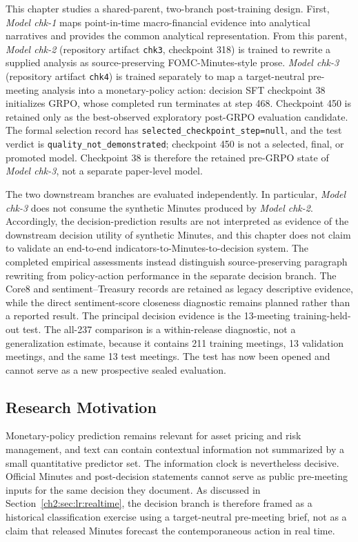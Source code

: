 This chapter studies a shared-parent, two-branch post-training design. First,
\textit{Model chk-1} maps point-in-time macro-financial evidence into analytical
narratives and provides the common analytical representation. From this parent,
\textit{Model chk-2} (repository artifact \texttt{chk3}, checkpoint 318) is
trained to rewrite a supplied analysis as source-preserving
FOMC-Minutes-style prose. \textit{Model chk-3} (repository artifact
\texttt{chk4}) is trained separately to map a target-neutral pre-meeting
analysis into a monetary-policy action: decision SFT checkpoint 38 initializes
GRPO, whose completed run terminates at step 468. Checkpoint 450 is retained
only as the best-observed exploratory post-GRPO evaluation candidate. The
formal selection record has \texttt{selected\_checkpoint\_step=null}, and the
test verdict is \texttt{quality\_not\_demonstrated}; checkpoint 450 is not a
selected, final, or promoted model. Checkpoint 38 is therefore the retained
pre-GRPO state of \textit{Model chk-3}, not a separate paper-level model.

The two downstream branches are evaluated independently. In particular,
\textit{Model chk-3} does not consume the synthetic Minutes produced by
\textit{Model chk-2}. Accordingly, the decision-prediction results are not
interpreted as evidence of the downstream decision utility of synthetic
Minutes, and this chapter does not claim to validate an end-to-end
indicators-to-Minutes-to-decision system. The completed empirical assessments
instead distinguish source-preserving paragraph rewriting from policy-action
performance in the separate decision branch. The Core8 and
sentiment--Treasury records are retained as legacy descriptive evidence, while
the direct sentiment-score closeness diagnostic remains planned rather than a
reported result. The principal decision evidence is the 13-meeting
training-held-out test. The all-237 comparison is a within-release diagnostic,
not a generalization estimate, because it contains 211 training meetings, 13
validation meetings, and the same 13 test meetings. The test has now been
opened and cannot serve as a new prospective sealed evaluation.



\subsection*{Research Motivation}

Monetary-policy prediction remains relevant for asset pricing and risk
management, and text can contain contextual information not summarized by a
small quantitative predictor set. The information clock is nevertheless
decisive. Official Minutes and post-decision statements cannot serve as public
pre-meeting inputs for the same decision they document. As discussed in
Section~\ref{ch2:sec:lr:realtime}, the decision branch is therefore framed as
a historical classification exercise using a target-neutral pre-meeting
brief, not as a claim that released Minutes forecast the contemporaneous
action in real time.


